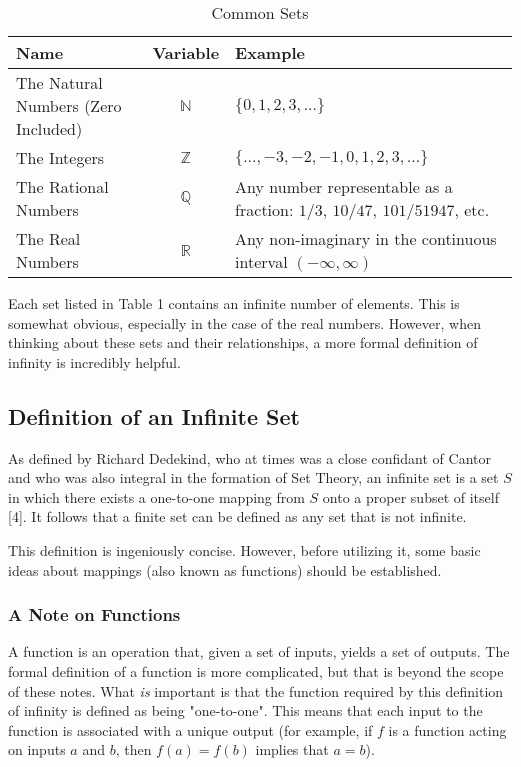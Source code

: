 \documentclass{article}
\begin{document}
\renewcommand{\arraystretch}{1.5}
\begin{table}[hbt!]
 \caption{Common Sets}
  \centering
  \begin{tabular}{lcl}
    \toprule
    Name     & Variable     & Example \\
    \midrule

    The Natural Numbers (Zero Included)   &   $\mathbb{N}$    & $\{ 0, 1, 2, 3, ... \}$ \\ \hline{}

    The Integers   &   $\mathbb{Z}$    & $\{ ..., -3, -2, -1, 0, 1, 2, 3, ... \}$ \\ \hline{}

    The Rational Numbers   &   $\mathbb{Q}$    & Any number representable as a fraction: $1/3$, $10/47$, $101/51947$, etc. \\ \hline{}

    The Real Numbers   &   $\mathbb{R}$    & Any non-imaginary in the continuous interval $(-\infty, \infty)$ \\

    \bottomrule
  \end{tabular}
  \label{tab:table}
\end{table}

Each set listed in Table 1 contains an infinite number of elements.  This is somewhat obvious, especially in the case of the real numbers.  However, when thinking about these sets and their relationships, a more formal definition of infinity is incredibly helpful.

\subsection{Definition of an Infinite Set}
As defined by Richard Dedekind, who at times was a close confidant of Cantor and who was also integral in the formation of Set Theory, an infinite set is a set $S$ in which there exists a one-to-one mapping from $S$ onto a proper subset of itself [4].  It follows that a finite set can be defined as any set that is not infinite.

This definition is ingeniously concise.  However, before utilizing it, some basic ideas about mappings (also known as functions) should be established.

\subsubsection{A Note on Functions}
A function is an operation that, given a set of inputs, yields a set of outputs.  The formal definition of a function is more complicated, but that is beyond the scope of these notes.  What {\em is} important is that the function required by this definition of infinity is defined as being "one-to-one".  This means that each input to the function is associated with a unique output (for example, if $f$ is a function acting on inputs $a$ and $b$, then $f(a) = f(b)$ implies that $a = b$).
\end{document}
